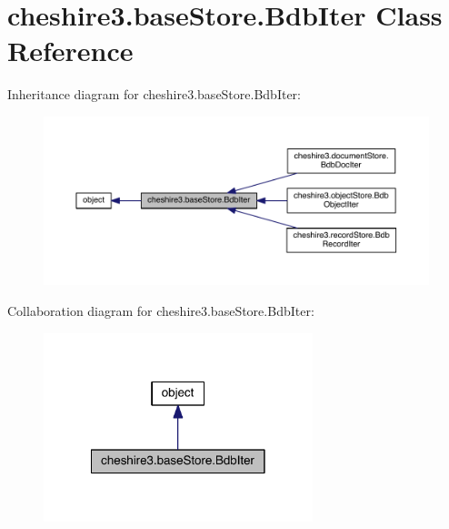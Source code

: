 \hypertarget{classcheshire3_1_1base_store_1_1_bdb_iter}{\section{cheshire3.\-base\-Store.\-Bdb\-Iter Class Reference}
\label{classcheshire3_1_1base_store_1_1_bdb_iter}
}


Inheritance diagram for cheshire3.\-base\-Store.\-Bdb\-Iter\-:
\nopagebreak
\begin{figure}[H]
\begin{center}
\leavevmode
\includegraphics[width=350pt]{classcheshire3_1_1base_store_1_1_bdb_iter__inherit__graph}
\end{center}
\end{figure}


Collaboration diagram for cheshire3.\-base\-Store.\-Bdb\-Iter\-:
\nopagebreak
\begin{figure}[H]
\begin{center}
\leavevmode
\includegraphics[width=222pt]{classcheshire3_1_1base_store_1_1_bdb_iter__coll__graph}
\end{center}
\end{figure}
